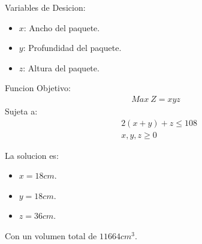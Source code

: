 \begin{homeworkProblem}[-1][Paquete]
Variables de Desicion:
\begin{itemize}
    \item $x$: Ancho del paquete.
    \item $y$: Profundidad del paquete.
    \item $z$: Altura del paquete.
\end{itemize}
Funcion Objetivo:
\begin{align*}
    Max\ Z = xyz
\end{align*}
Sujeta a:
\begin{align*}
    &2(x+y)+z\leq 108 \\
    &x,y,z\geq0
\end{align*}

La solucion es:
\begin{itemize}
    \item $x=18cm$.
    \item $y=18cm$.
    \item $z=36cm$.
\end{itemize}
Con un volumen total de $11664cm^3$.
\end{homeworkProblem}